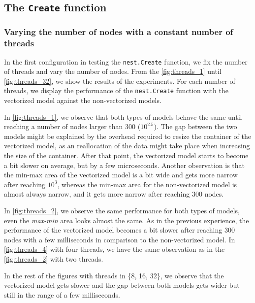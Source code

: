 \subsection{The \texttt{Create} function}

\subsubsection{Varying the number of nodes with a constant number of threads}

 In the first configuration in testing the \texttt{nest.Create} function, we fix the number of threads and vary the number of nodes. From the  \autoref{fig:threads_1} until \autoref{fig:threads_32}, we show the results of the experiments. For each number of threads, we display the performance of the \texttt{nest.Create} function with the vectorized model against the non-vectorized models. 


In \autoref{fig:threads_1}, we observe that both types of models behave the same until reaching a number of nodes larger than 300 ($10^{2.5}$). The gap between the two models might be explained by the overhead required to resize the container of the vectorized model, as an reallocation of the data might take place when increasing the size of the container. After that point, the vectorized model starts to become a bit slower on average, but by a few microseconds. Another observation is that the min-max area of the vectorized model is a bit wide and gets more narrow after reaching $10^3$, whereas the min-max area for the non-vectorized model is almost always narrow, and it gets more narrow after reaching 300 nodes.

In \autoref{fig:threads_2}, we observe the same performance for both types of models, even the \emph{max-min} area looks almost the same. As in the previous experience, the performance of the vectorized model becomes a bit slower after reaching 300 nodes with a few milliseconds in comparison to the non-vectorized model. In \autoref{fig:threads_4} with four threads, we have the same observation as in the \autoref{fig:threads_2} with two threads.

In the rest of the figures with threads in \{8, 16, 32\}, we observe that the vectorized model gets slower and the gap between both models gets wider but still in the range of a few milliseconds.

